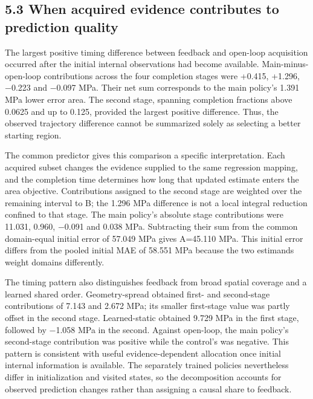 \subsection{5.3 When acquired evidence contributes to prediction quality}\label{when-acquired-evidence-contributes-to-prediction-quality}

The largest positive timing difference between feedback and open-loop acquisition occurred after the initial internal observations had become available. Main-minus-open-loop contributions across the four completion stages were +0.415, +1.296, −0.223 and −0.097 MPa. Their net sum corresponds to the main policy's 1.391 MPa lower error area. The second stage, spanning completion fractions above 0.0625 and up to 0.125, provided the largest positive difference. Thus, the observed trajectory difference cannot be summarized solely as selecting a better starting region.

The common predictor gives this comparison a specific interpretation. Each acquired subset changes the evidence supplied to the same regression mapping, and the completion time determines how long that updated estimate enters the area objective. Contributions assigned to the second stage are weighted over the remaining interval to B; the 1.296 MPa difference is not a local integral reduction confined to that stage. The main policy's absolute stage contributions were 11.031, 0.960, −0.091 and 0.038 MPa. Subtracting their sum from the common domain-equal initial error of 57.049 MPa gives A=45.110 MPa. This initial error differs from the pooled initial MAE of 58.551 MPa because the two estimands weight domains differently.

The timing pattern also distinguishes feedback from broad spatial coverage and a learned shared order. Geometry-spread obtained first- and second-stage contributions of 7.143 and 2.672 MPa; its smaller first-stage value was partly offset in the second stage. Learned-static obtained 9.729 MPa in the first stage, followed by −1.058 MPa in the second. Against open-loop, the main policy's second-stage contribution was positive while the control's was negative. This pattern is consistent with useful evidence-dependent allocation once initial internal information is available. The separately trained policies nevertheless differ in initialization and visited states, so the decomposition accounts for observed prediction changes rather than assigning a causal share to feedback.

